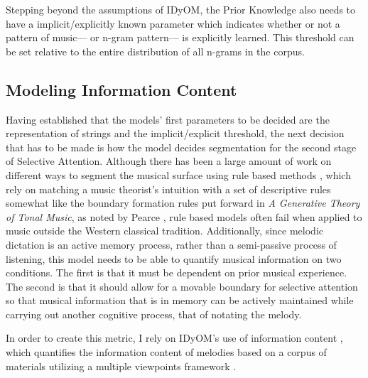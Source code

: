 \documentclass[12pt,]{book}
\begin{document}
Stepping beyond the assumptions of IDyOM, the Prior Knowledge also needs to have a implicit/explicitly known parameter which indicates whether or not a pattern of music--- or n-gram pattern--- is explicitly learned.
This threshold can be set relative to the entire distribution of all n-grams in the corpus.

\hypertarget{modeling-information-content}{%
\subsection{Modeling Information Content}\label{modeling-information-content}}

Having established that the models' first parameters to be decided are the representation of strings and the implicit/explicit threshold, the next decision that has to be made is how the model decides segmentation for the second stage of Selective Attention.
Although there has been a large amount of work on different ways to segment the musical surface using rule based methods \citep{lerdahlGenerativeTheoryTonal1986, margulisModelMelodicExpectation2005, narmourAnalysisCognitionBasic1990, narmourAnalysisCognitionMelodic1992}, which rely on matching a music theorist's intuition with a set of descriptive rules somewhat like the boundary formation rules put forward in \emph{A Generative Theory of Tonal Music}, as noted by Pearce \citep{pearceStatisticalLearningProbabilistic2018a}, rule based models often fail when applied to music outside the Western classical tradition.
Additionally, since melodic dictation is an active memory process, rather than a semi-passive process of listening, this model needs to be able to quantify musical information on two conditions.
The first is that it must be dependent on prior musical experience.
The second is that it should allow for a movable boundary for selective attention so that musical information that is in memory can be actively maintained while carrying out another cognitive process, that of notating the melody.

In order to create this metric, I rely on IDyOM's use of information content \citep{shannonMathematicalTheoryCommunication1948}, which quantifies the information content of melodies based on a corpus of materials utilizing a multiple viewpoints framework \citep{conklinMultipleViewpointSystems1995}.
\end{document}
